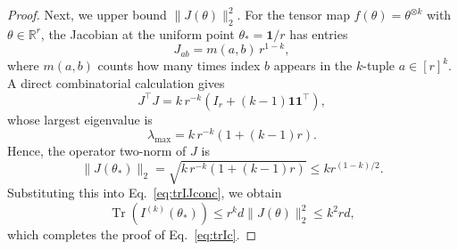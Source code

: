 \documentclass[10pt,a4paper]{amsart}
\begin{document}
\begin{proof}
Next, we upper bound $\| J(\theta) \|_2^2$.
For the tensor map $f(\theta) = \theta^{\otimes k}$ with $\theta \in \mathbb{R}^r$, 
the Jacobian at the uniform point $\theta_* = \mathbf{1}/r$ has entries
\begin{equation}
    J_{ab} = m(a,b)\,r^{1-k},
\end{equation}
where $m(a,b)$ counts how many times index $b$ appears in the $k$-tuple $a \in [r]^k$.
A direct combinatorial calculation gives
\begin{equation}
    J^\top J = k\,r^{-k}\!\left(I_r + (k-1)\mathbf{1}\mathbf{1}^\top\right),
\end{equation}
whose largest eigenvalue is
\begin{equation}
    \lambda_{\max} = k\,r^{-k}\!\left(1 + (k-1)r\right).
\end{equation}
Hence, the operator two-norm of $J$ is
\begin{equation}
    \|J(\theta_*)\|_2
    = \sqrt{k\,r^{-k}\!\left(1 + (k-1)r\right)} \le k r^{(1-k)/2}.
\end{equation}
Substituting this into Eq.~\ref{eq:trIJconc}, we obtain
\begin{equation}
    \operatorname{Tr}(I^{(k)}(\theta_*)) \le r^k d  \| J(\theta) \|_2^2 \le k^2 r d,
\end{equation}
which completes the proof of Eq.~\ref{eq:trIc}.
\end{proof}
\end{document}
